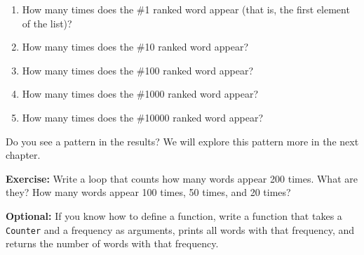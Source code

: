\begin{enumerate}
\def\labelenumi{\arabic{enumi}.}
\item
  How many times does the \#1 ranked word appear (that is, the first
  element of the list)?
\item
  How many times does the \#10 ranked word appear?
\item
  How many times does the \#100 ranked word appear?
\item
  How many times does the \#1000 ranked word appear?
\item
  How many times does the \#10000 ranked word appear?
\end{enumerate}

Do you see a pattern in the results? We will explore this pattern more
in the next chapter.

\textbf{Exercise:} Write a loop that counts how many words appear 200
times. What are they? How many words appear 100 times, 50 times, and 20
times?

\textbf{Optional:} If you know how to define a function, write a
function that takes a \passthrough{\lstinline!Counter!} and a frequency
as arguments, prints all words with that frequency, and returns the
number of words with that frequency.

